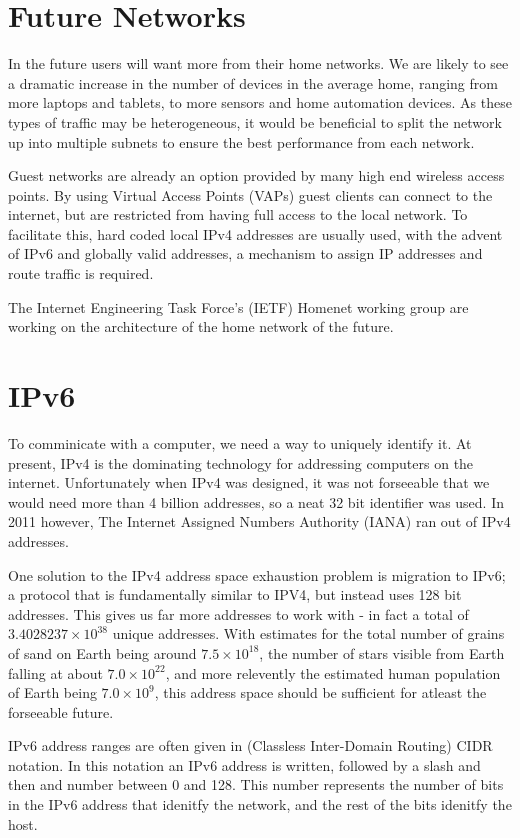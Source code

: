 \documentclass[12pt]{report}
\begin{document}
\section{Future Networks}
In the future users will want more from their home networks. We are likely to
see a dramatic increase in the number of devices in the average home, ranging
from more laptops and tablets, to more sensors and home automation devices.
As these types of traffic may be heterogeneous, it would be beneficial to split
the network up into multiple subnets to ensure the best performance from each
network. 

Guest networks are already an option provided by many high end wireless access
points. By using Virtual Access Points (VAPs) guest clients can connect to the
internet, but are restricted from having full access to the local network. To
facilitate this, hard coded local IPv4 addresses are usually used, with the
advent of IPv6 and globally valid addresses, a mechanism to assign IP addresses
and route traffic is required.  

The Internet Engineering Task Force's (IETF) Homenet working group are working on the architecture of the home network of the future. 

\section{IPv6}
To comminicate with a computer, we need a way to uniquely identify it. At
present, IPv4 is the dominating technology for addressing computers on the
internet. Unfortunately when IPv4 was designed, it was not forseeable that we
would need more than 4 billion addresses, so a neat 32 bit identifier was used.
In 2011 however, The Internet Assigned Numbers Authority (IANA) ran out of IPv4 
addresses. 

One solution to the IPv4 address space exhaustion problem is migration to
IPv6; a protocol that is fundamentally similar to IPV4, but instead uses 128
bit addresses. This gives us far more addresses to work with - in fact a total
of $3.4028237\times10^{38}$ unique addresses. With estimates for the total
number of grains of sand on Earth being around $7.5\times10^{18}$, the number
of stars visible from Earth falling at about $7.0\times10^{22}$, and more
relevently the estimated human population of Earth being $7.0\times10^{9}$,
this address space should be sufficient for atleast the forseeable future. 

IPv6 address ranges are often given in (Classless Inter-Domain Routing) CIDR 
notation. In this notation an IPv6 address is written, followed by a slash and then 
and number between 0 and 128. This number represents the number of bits in the IPv6 
address that idenitfy the network, and the rest of the bits idenitfy the host.
\end{document}
